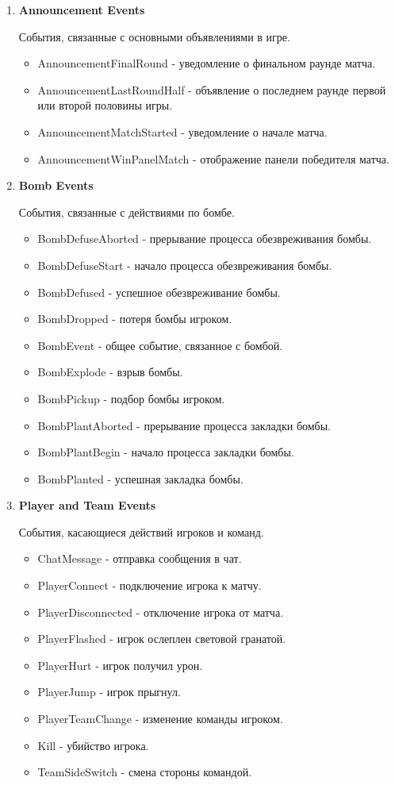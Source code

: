 \begin{enumerate}
	\item \textbf{Announcement Events}
	
	События, связанные с основными объявлениями в игре.
	\begin{itemize}
	\item AnnouncementFinalRound - уведомление о финальном раунде матча.
	\item AnnouncementLastRoundHalf - объявление о последнем раунде первой или второй половины игры.
	\item AnnouncementMatchStarted - уведомление о начале матча.
	\item AnnouncementWinPanelMatch - отображение панели победителя матча.
	\end{itemize}
	
	\item \textbf{Bomb Events}
	
	События, связанные с действиями по бомбе.
	\begin{itemize}
		\item BombDefuseAborted - прерывание процесса обезвреживания бомбы.
		\item BombDefuseStart - начало процесса обезвреживания бомбы.
		\item BombDefused - успешное обезвреживание бомбы.
		\item BombDropped - потеря бомбы игроком.
		\item BombEvent - общее событие, связанное с бомбой.
		\item BombExplode - взрыв бомбы.
		\item BombPickup - подбор бомбы игроком.
		\item BombPlantAborted - прерывание процесса закладки бомбы.
		\item BombPlantBegin - начало процесса закладки бомбы.
		\item BombPlanted - успешная закладка бомбы.
	\end{itemize}
	
	\item \textbf{Player and Team Events}
	
	События, касающиеся действий игроков и команд.
	\begin{itemize}
		\item ChatMessage - отправка сообщения в чат.
		\item PlayerConnect - подключение игрока к матчу.
		\item PlayerDisconnected - отключение игрока от матча.
		\item PlayerFlashed - игрок ослеплен световой гранатой.
		\item PlayerHurt - игрок получил урон.
		\item PlayerJump - игрок прыгнул.
		\item PlayerTeamChange - изменение команды игроком.
		\item Kill - убийство игрока.
		\item TeamSideSwitch - смена стороны командой.
	\end{itemize}
	

\end{enumerate}

